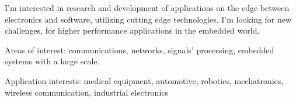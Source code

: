 


\begin{cventries}


\begin{flushleft}

I'm interested in research and development of applications on the edge between electronics and software, utilizing cutting edge
technologies. I'm looking for new challenges, for higher performance applications in the embedded world.
\newline

Areas of interest: communications, networks, signals' processing, embedded systems with a large scale. 
\newline

Application interests: medical equipment, automotive, robotics, mechatronics, wireless communication, industrial electronics
\end{flushleft}


\end{cventries}